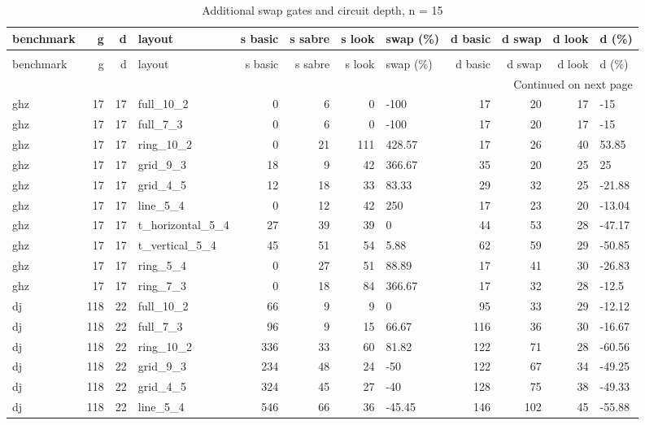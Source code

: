 \begin{longtable}{lrrlrrrlrrrl}
\caption{Additional swap gates and circuit depth, n = 15} \label{benchmark-table-15} \\
\toprule
benchmark & g & d & layout & s basic & s sabre & s look & swap (\%) & d basic & d swap & d look & d (\%) \\
\midrule
\endfirsthead
\caption[]{Additional swap gates and circuit depth, n = 15} \\
\toprule
benchmark & g & d & layout & s basic & s sabre & s look & swap (\%) & d basic & d swap & d look & d (\%) \\
\midrule
\endhead
\midrule
\multicolumn{12}{r}{Continued on next page} \\
\midrule
\endfoot
\bottomrule
\endlastfoot
ghz & 17 & 17 & full\_10\_2 & 0 & 6 & 0 & -100 & 17 & 20 & 17 & -15 \\
ghz & 17 & 17 & full\_7\_3 & 0 & 6 & 0 & -100 & 17 & 20 & 17 & -15 \\
ghz & 17 & 17 & ring\_10\_2 & 0 & 21 & 111 & 428.57 & 17 & 26 & 40 & 53.85 \\
ghz & 17 & 17 & grid\_9\_3 & 18 & 9 & 42 & 366.67 & 35 & 20 & 25 & 25 \\
ghz & 17 & 17 & grid\_4\_5 & 12 & 18 & 33 & 83.33 & 29 & 32 & 25 & -21.88 \\
ghz & 17 & 17 & line\_5\_4 & 0 & 12 & 42 & 250 & 17 & 23 & 20 & -13.04 \\
ghz & 17 & 17 & t\_horizontal\_5\_4 & 27 & 39 & 39 & 0 & 44 & 53 & 28 & -47.17 \\
ghz & 17 & 17 & t\_vertical\_5\_4 & 45 & 51 & 54 & 5.88 & 62 & 59 & 29 & -50.85 \\
ghz & 17 & 17 & ring\_5\_4 & 0 & 27 & 51 & 88.89 & 17 & 41 & 30 & -26.83 \\
ghz & 17 & 17 & ring\_7\_3 & 0 & 18 & 84 & 366.67 & 17 & 32 & 28 & -12.5 \\
dj & 118 & 22 & full\_10\_2 & 66 & 9 & 9 & 0 & 95 & 33 & 29 & -12.12 \\
dj & 118 & 22 & full\_7\_3 & 96 & 9 & 15 & 66.67 & 116 & 36 & 30 & -16.67 \\
dj & 118 & 22 & ring\_10\_2 & 336 & 33 & 60 & 81.82 & 122 & 71 & 28 & -60.56 \\
dj & 118 & 22 & grid\_9\_3 & 234 & 48 & 24 & -50 & 122 & 67 & 34 & -49.25 \\
dj & 118 & 22 & grid\_4\_5 & 324 & 45 & 27 & -40 & 128 & 75 & 38 & -49.33 \\
dj & 118 & 22 & line\_5\_4 & 546 & 66 & 36 & -45.45 & 146 & 102 & 45 & -55.88 \\

\end{longtable}
